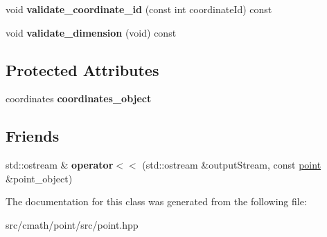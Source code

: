 \begin{DoxyCompactItemize}
\item 
\hypertarget{classxstd_1_1point_a9c83662efe0927f03cb9cb1cfab796cd}{void {\bfseries validate\-\_\-coordinate\-\_\-id} (const int coordinate\-Id) const }\label{classxstd_1_1point_a9c83662efe0927f03cb9cb1cfab796cd}

\item 
\hypertarget{classxstd_1_1point_a1d9e30c142c79d1c21bdb271c81dabb5}{void {\bfseries validate\-\_\-dimension} (void) const }\label{classxstd_1_1point_a1d9e30c142c79d1c21bdb271c81dabb5}

\end{DoxyCompactItemize}
\subsection*{Protected Attributes}
\begin{DoxyCompactItemize}
\item 
\hypertarget{classxstd_1_1point_a6ee0acdc7f3fdd004426279d0d7963e6}{coordinates {\bfseries coordinates\-\_\-object}}\label{classxstd_1_1point_a6ee0acdc7f3fdd004426279d0d7963e6}

\end{DoxyCompactItemize}
\subsection*{Friends}
\begin{DoxyCompactItemize}
\item 
\hypertarget{classxstd_1_1point_a26f9c85c349535d8d87c0b2b4dda134e}{std\-::ostream \& {\bfseries operator$<$$<$} (std\-::ostream \&output\-Stream, const \hyperlink{classxstd_1_1point}{point} \&point\-\_\-object)}\label{classxstd_1_1point_a26f9c85c349535d8d87c0b2b4dda134e}

\end{DoxyCompactItemize}


The documentation for this class was generated from the following file\-:\begin{DoxyCompactItemize}
\item 
src/cmath/point/src/point.\-hpp\end{DoxyCompactItemize}
